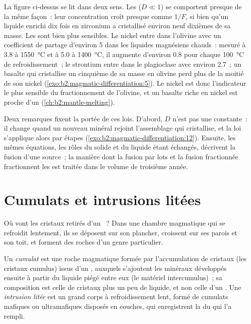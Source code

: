 La figure ci-dessus se lit dans deux sens. Les  ($D \ll 1$) se comportent
presque de la même façon~: leur concentration croît presque comme $1/F$, si bien qu'un liquide enrichi
dix fois en zirconium a cristallisé environ neuf dixièmes de sa masse. Les 
sont bien plus sensibles. Le nickel entre dans l'olivine avec un coefficient de partage d'environ 5
dans les liquides magnésiens chauds~: mesuré à 3.8 à
\qty{1550}{\celsius} et à 5.0 à \qty{1400}{\celsius}, il augmente d'environ 0.8 pour chaque
\qty{100}{\celsius} de refroidissement~; le strontium entre dans le plagioclase avec environ 2.7~; un basalte
qui cristallise un cinquième de sa masse en olivine perd plus de la moitié de son nickel
(\cref{exo:b2:magmatic-differentiation:5}). Le nickel est donc l'indicateur le plus sensible
du fractionnement de l'olivine, et un basalte riche en nickel est proche d'un 
(\cref{ch:b2:mantle-melting}).

Deux remarques fixent la portée de ces lois. D'abord, $D$ n'est pas une constante~: il change
quand un nouveau minéral rejoint l'assemblage qui cristallise, et la loi s'applique alors par étapes
(\cref{exo:b2:magmatic-differentiation:12}). Ensuite, les mêmes équations, les rôles du solide et du liquide étant échangés,
décrivent la fusion d'une source~; la manière dont la fusion par lots et la fusion fractionnée fractionnent les 
est traitée dans le volume de troisième année.

\section{Cumulats et intrusions litées}\label{sec:b2:magmatic-differentiation:cumulates}

Où vont les cristaux retirés d'un ~? Dans une chambre magmatique qui se refroidit
lentement, ils se déposent sur son plancher, croissent sur ses parois et son toit, et forment
des roches d'un genre particulier.

\begin{definition}\label{def:b2:magmatic-differentiation:cumulate}
Un \emph{cumulat} est une roche magmatique formée par l'accumulation de
cristaux (les cristaux cumulus) issus d'un , auxquels s'ajoutent les minéraux développés ensuite
à partir du liquide piégé entre eux (le matériel intercumulus)~; sa composition
est celle de cristaux plus un peu de liquide, et non celle d'un . Une \emph{intrusion
litée} est un grand corps à refroidissement lent, formé de cumulats mafiques ou
ultramafiques disposés en couches, qui enregistrent la  du
 qui l'a rempli.
\end{definition}

